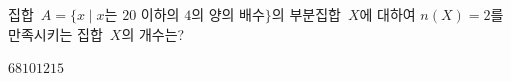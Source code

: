 집합~$A=\{x \mid x$는 $20$ 이하의 $4$의 양의 배수$\}$의 부분집합~$X$에 대하여 $n(X)=2$를 만족시키는 집합~$X$의 개수는?
\begin{choices32}{$6$}{$8$}{$10$}{$12$}{$15$}\end{choices32}
